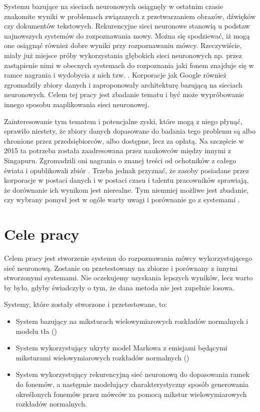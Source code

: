Systemu bazujące na sieciach neuronowych osiągnęły w ostatnim czasie znakomite wyniki w problemach
związanych z przetwarzaniem obrazów, dźwięków czy dokumentów tekstowych. Rekurencyjne sieci neuronowe
stanowią u podstaw najnowszych systemów do rozpoznawania mowy. Można się spodziewać, iż mogą one
osiągnąć również dobre wyniki przy rozpoznawaniu mówcy. Rzeczywiście, miały już miejsce próby
wykorzystania głębokich sieci neuronowych np. przez zastąpienie nimi  w obecnych systemach do rozpoznania
jaki fonem znajduje się w ramce nagrania i wydobycia z nich tzw. \cite{investigationOfBottleneck}.
Korporacje jak Google również zgromadziły zbiory danych i zaproponowały architekturę bazującą na sieciach
neuronowych\cite{endToEnd}. Celem tej pracy jest zbadanie tematu i być może wypróbowanie innego sposobu zaaplikowania
sieci neuronowej.

Zainteresowanie tym tematem i potencjalne zyski, które mogą z niego płynąć, sprawiło niestety,
że zbiory danych dopasowane do badania tego problemu są albo chronione przez przedsiębiorców,
albo dostępne, lecz za opłatą. Na szczęście w 2015 ta potrzeba
została zaadresowana przez naukowców między innymi z Singapuru. Zgromadzili oni nagrania o znanej
treści od ochotników z całego świata i opublikowali zbiór . Trzeba jednak przyznać, że
zasoby posiadane przez korporacje w postaci danych i w postaci czasu i talentu pracowników sprawiają,
że dorównanie ich wynikom jest nierealne. Tym niemniej możliwe jest zbadanie, czy wybrany pomysł
jest w ogóle warty uwagi i porównanie go z systemami .

\section{Cele pracy}\label{sec:cele_pracy}

Celem pracy jest stworzenie systemu do rozpoznawania mówcy wykorzystującego sieć neuronową.
Zostanie on przetestowany na zbiorze  i porównany z innymi stworzonymi systemami.
Nie oczekujemy uzyskania lepszych wyników, lecz warto by było, gdyby świadczyły o tym,
że dana metoda nie jest zupełnie losowa.

Systemy, które zostały stworzone i przetestowane, to:

\begin{itemize}
    \item System bazujący na miksturach wielowymiarowych rozkładów normalnych i modelu tła ()
    \item System wykorzystujący ukryty model Markowa z emisjami będącymi miksturami wielowymiarowych rozkładów normalnych ()
    \item System wykorzystujący rekurencyjną sieć neuronową do dopasowania ramek do fonemów, a następnie modelujący charakterystyczny sposób generowania określonych fonemów przez mówców za pomocą mikstur wielowymiarowych rozkładów normalnych.
\end{itemize}

